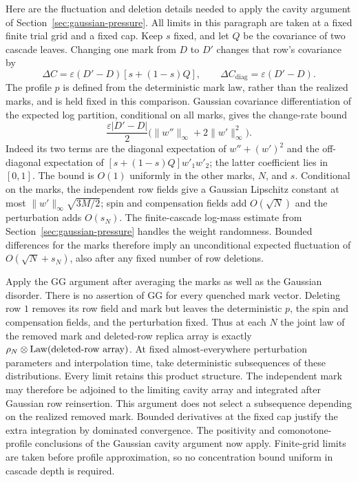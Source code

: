 \documentclass[11pt,a4paper]{article}
\numberwithin{equation}{section}
\theoremstyle{definition}
\theoremstyle{remark}
\newcommand{\eps}{\varepsilon}
\begin{document}
Here are the fluctuation and deletion details needed to apply the cavity
argument of Section~\ref{sec:gaussian-pressure}.  All limits in this
paragraph are taken at a fixed finite trial grid and a fixed cap.  Keep
$s$ fixed, and let $Q$ be the covariance of two cascade leaves.
Changing one mark from $D$ to $D'$ changes that row's
covariance by
\[
 \Delta C=\eps(D'-D)[s+(1-s)Q],\qquad
 \Delta C_{\mathrm{diag}}=\eps(D'-D).
\]
The profile $p$ is defined from the deterministic mark law, rather than
the realized marks, and is held fixed in this comparison.  Gaussian
covariance differentiation of the expected log partition, conditional on
all marks, gives the change-rate bound
\[
 \frac{\eps|D'-D|}{2}
       \bigl(\|w''\|_\infty+2\|w'\|_\infty^2\bigr).
\]
Indeed its two terms are the diagonal expectation of $w''+(w')^2$ and
the off-diagonal expectation of $[s+(1-s)Q]w'_1w'_2$; the latter
coefficient lies in $[0,1]$.  The bound is $O(1)$ uniformly in the other
marks, $N$, and $s$.  Conditional on the marks, the independent row fields
give a Gaussian Lipschitz constant at most
$\|w'\|_\infty\sqrt{3M/2}$; spin and compensation fields add
$O(\sqrt N)$ and the perturbation adds $O(s_N)$.  The finite-cascade
log-mass estimate from Section~\ref{sec:gaussian-pressure} handles the
weight randomness.  Bounded differences for the marks therefore imply
an unconditional expected fluctuation of $O(\sqrt N+s_N)$, also after
any fixed number of row deletions.

Apply the GG argument after averaging the marks as well as the Gaussian
disorder.  There is no assertion of GG for every quenched mark vector.
Deleting row $1$ removes its row field and mark but leaves the
deterministic $p$, the spin and compensation fields, and the perturbation
fixed.  Thus at each $N$ the joint law of the removed mark and deleted-row
replica array is exactly
$\rho_N\otimes\mathop{\rm Law}(\text{deleted-row array})$.
At fixed almost-everywhere perturbation parameters and interpolation
time, take deterministic subsequences of these distributions.  Every
limit retains this product structure.  The independent mark may
therefore be adjoined to the limiting cavity array and integrated after
Gaussian row reinsertion.  This argument does not select a subsequence
depending on the realized removed mark.  Bounded derivatives at the
fixed cap justify the extra integration by dominated convergence.
The positivity and comonotone-profile conclusions of the Gaussian
cavity argument now apply.  Finite-grid limits are taken before profile
approximation, so no concentration bound uniform in cascade depth is
required.
\end{document}
